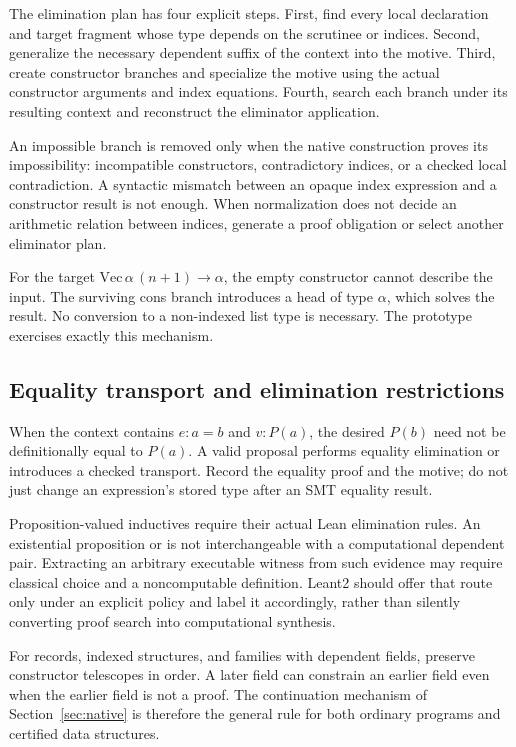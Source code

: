 The elimination plan has four explicit steps. First, find every local declaration and target fragment whose type depends on the scrutinee or indices. Second, generalize the necessary dependent suffix of the context into the motive. Third, create constructor branches and specialize the motive using the actual constructor arguments and index equations. Fourth, search each branch under its resulting context and reconstruct the eliminator application.

An impossible branch is removed only when the native construction proves its impossibility: incompatible constructors, contradictory indices, or a checked local contradiction. A syntactic mismatch between an opaque index expression and a constructor result is not enough. When normalization does not decide an arithmetic relation between indices, generate a proof obligation or select another eliminator plan.

For the target $\mathrm{Vec}\,\alpha\,(n+1)\to\alpha$, the empty constructor cannot describe the input. The surviving cons branch introduces a head of type $\alpha$, which solves the result. No conversion to a non-indexed list type is necessary. The prototype exercises exactly this mechanism.

\subsection{Equality transport and elimination restrictions}
When the context contains $e:a=b$ and $v:P(a)$, the desired $P(b)$ need not be definitionally equal to $P(a)$. A valid proposal performs equality elimination or introduces a checked transport. Record the equality proof and the motive; do not just change an expression's stored type after an SMT equality result.

Proposition-valued inductives require their actual Lean elimination rules. An existential proposition or  is not interchangeable with a computational dependent pair. Extracting an arbitrary executable witness from such evidence may require classical choice and a noncomputable definition. Leant2 should offer that route only under an explicit policy and label it accordingly, rather than silently converting proof search into computational synthesis.\cite{inductives,axioms}

For records, indexed structures, and families with dependent fields, preserve constructor telescopes in order. A later field can constrain an earlier field even when the earlier field is not a proof. The continuation mechanism of Section~\ref{sec:native} is therefore the general rule for both ordinary programs and certified data structures.

